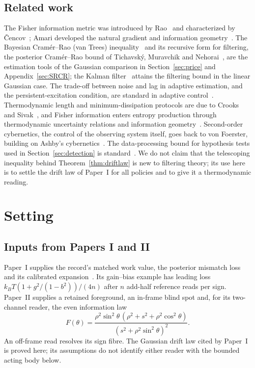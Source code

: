 \documentclass[12pt]{article}
\theoremstyle{definition}
\begin{document}
\subsection{Related work}
\label{subsec:related}

The Fisher information metric was introduced by Rao~\cite{Rao1945} and characterized by \v{C}encov~\cite{Cencov1982}; Amari developed the natural gradient and information geometry~\cite{Amari1998,AmariNagaoka2000}. The Bayesian Cram\'er--Rao (van Trees) inequality~\cite{vanTrees1968} and its recursive form for filtering, the posterior Cram\'er--Rao bound of Tichavsk\'y, Muravchik and Nehorai~\cite{Tichavsky1998}, are the estimation tools of the Gaussian comparison in Section~\ref{sec:price} and Appendix~\ref{sec:SRCR}; the Kalman filter~\cite{Kalman1960} attains the filtering bound in the linear Gaussian case. The trade-off between noise and lag in adaptive estimation, and the persistent-excitation condition, are standard in adaptive control~\cite{AstromWittenmark1995}. Thermodynamic length and minimum-dissipation protocols are due to Crooks and Sivak~\cite{Crooks2007,SivakCrooks2012}, and Fisher information enters entropy production through thermodynamic uncertainty relations and information geometry~\cite{BaratoSeifert2015,Ito2018}. Second-order cybernetics, the control of the observing system itself, goes back to von Foerster, building on Ashby's cybernetics~\cite{Ashby1956,vonFoerster2003}. The data-processing bound for hypothesis tests used in Section~\ref{sec:detection} is standard~\cite{CoverThomas2006}. We do not claim that the telescoping inequality behind Theorem~\ref{thm:driftlaw} is new to filtering theory; its use here is to settle the drift law of Paper~I for all policies and to give it a thermodynamic reading.

\section{Setting}
\label{sec:prelim}

\subsection{Inputs from Papers I and II}
\label{subsec:from_I}\label{subsec:from_II}
Paper~I supplies the record's matched work value, the posterior mismatch
loss and its calibrated expansion~\cite{Liu2026TDOME_I}.
Its gain--bias example has leading loss
$k_BT(1+g^2/(1-b^2))/(4n)$ after $n$ add-half reference reads per sign.
Paper~II supplies a retained foreground, an in-frame blind spot and,
for its two-channel reader, the even information law~\cite{Liu2026TDOME_II}
\begin{equation}\label{eq:fisher_even_II}
 F(\theta)=\frac{\rho^2\sin^2\theta\,(\rho^2+s^2+\rho^2\cos^2\theta)}
 {(s^2+\rho^2\sin^2\theta)^2}.
\end{equation}
An off-frame read resolves its sign fibre. The Gaussian drift law cited
by Paper~I is proved here; its assumptions do not identify either reader
with the bounded acting body below.
\end{document}

